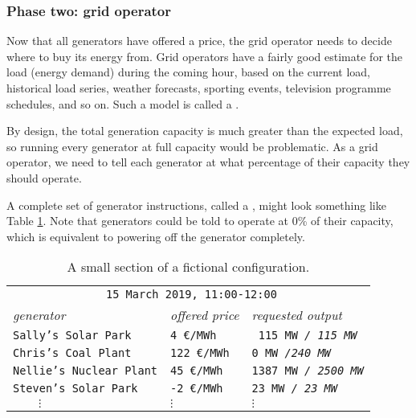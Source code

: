\documentclass[main.tex]{subfiles}
\begin{document}

\subsubsection*{Phase two: grid operator}
Now that all generators have offered a price, the grid operator needs to decide where to buy its energy from. Grid operators have a fairly good estimate for the load (energy demand) during the coming hour, based on the current load, historical load series, weather forecasts, sporting events, television programme schedules, and so on. Such a model is called a . 

By design, the total generation capacity is much greater than the expected load,  so running every generator at full capacity would be problematic.
As a grid operator, we need to tell each generator at what percentage of their capacity they should operate. 

A complete set of generator instructions, called a , might look something like Table \ref{tab:sampleconfiguration}. Note that generators could be told to operate at 0\% of their capacity, which is equivalent to powering off the generator completely.

\begin{table}[t]
    \centering
\begin{tabular}{l@{\hskip 2em}l@{\hskip 2em}l}
\toprule
    \multicolumn{3}{c}{\texttt{%
    15 March 2019, 11:00-12:00}}\\[.5em]
    \emph{generator} & \emph{offered price} & \emph{requested output} \\
\midrule
    \texttt{Sally's Solar Park} & \texttt{\hphantom{xx}4 \euro/MWh}  & \texttt{ 115 MW \emph{/ \hphantom{x}115 MW}} \\
    \texttt{Chris's Coal Plant} & \texttt{122 \euro/MWh}  & \texttt{\hphantom{xxx}0 MW \emph{/\hphantom{xx}240 MW}} \\
    \texttt{Nellie's Nuclear Plant} & \texttt{\hphantom{x}45 \euro/MWh}  & \texttt{1387 MW \emph{/ 2500 MW}} \\
    \texttt{Steven's Solar Park} & \texttt{\hphantom{x}-2 \euro/MWh}  & \texttt{\hphantom{xx}23 MW \emph{/ \hphantom{xx}23 MW}} \\
    $\qquad\vdots$ & \texttt{\hphantom{xx}}$\vdots$  & \texttt{\hphantom{xxx}}$\vdots$ \\
\bottomrule
\end{tabular}
    \caption{A small section of a fictional configuration.}
    \label{tab:sampleconfiguration}
\end{table}
\end{document}
